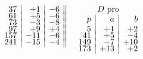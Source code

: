 \documentclass[twoside,12pt, showframe]{memoir}
\begin{document}
\[\begin{array}{cccc}
\begin{array}[t]{r|r|r||}
37&+1&-6\\[-4pt]
61&+5&-6\\[-4pt]
73&-3&-8\\[-4pt]
97&+9&+4\\[-4pt]
157&-11&-6\\[-4pt] 
241&-15&-4 
\end{array}
&
 \begin{array}[t]{r|r|r} 
 \multicolumn{3}{c}{ D \text{ pro} }\\
 p & a & b \\
5&+1&+2\\[-4pt]
41&+5&-4\\[-4pt]
149&-7&+10\\[-4pt]
173&+13&+2
\end{array}
\end{array}\]\clearpage\noindent%
\end{document}
